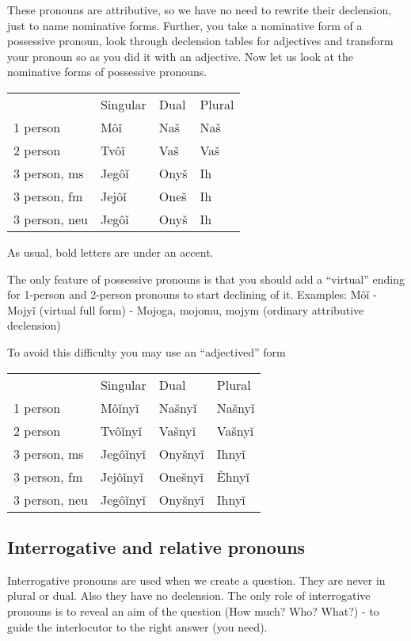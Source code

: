 These pronouns are attributive, so we have no need to rewrite their declension, just to name nominative forms. Further, you take a nominative form of a possessive pronoun, look through declension tables for adjectives and transform your pronoun so as you did it with an adjective. Now let us look at the nominative forms of possessive pronouns.

\begin{table}
	\begin{tabular}{llll}
		& Singular & Dual & Plural \\
		1 person & Môǐ & Naš & Naš \\
		2 person & Tvôǐ & Vaš & Vaš \\
		3 person, ms & Jegôǐ & Onyš & Ih \\
		3 person, fm & Jejôǐ & Oneš & Ih \\
		3 person, neu & Jegôǐ & Onyš & Ih
	\end{tabular}
\end{table}

As usual, bold letters are under an accent.

The only feature of possessive pronouns is that you should add a “virtual” ending for 1-person and 2-person pronouns to start declining of it.
Examples:
Môǐ - Mojyǐ (virtual full form) - Mojoga, mojomu, mojym (ordinary attributive declension) 

To avoid this difficulty you may use an “adjectived” form

\begin{table}
	\begin{tabular}{llll}
		& Singular & Dual & Plural \\
		1 person & Môǐnyǐ & Našnyǐ & Našnyǐ \\
		2 person & Tvôǐnyǐ & Vašnyǐ & Vašnyǐ \\
		3 person, ms & Jegôǐnyǐ & Onyšnyǐ & Ihnyǐ \\
		3 person, fm & Jejôǐnyǐ & Onešnyǐ & Ěhnyǐ \\
		3 person, neu & Jegôǐnyǐ & Onyšnyǐ & Ihnyǐ
	\end{tabular}
\end{table}

\subsection{Interrogative and relative pronouns}

Interrogative pronouns are used when we create a question. They are never in plural or dual. Also they have no declension. The only role of interrogative pronouns is to reveal an aim of the question (How much? Who? What?) - to guide the interlocutor to the right answer (you need).

